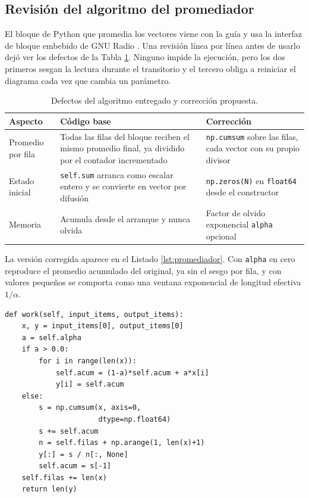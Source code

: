 \documentclass[twocolumn]{IEEEtran}
\begin{document}
\subsection{Revisión del algoritmo del promediador}

El bloque de Python que promedia los vectores viene con la guía y usa la interfaz de bloque embebido de GNU Radio \cite{b2}. Una revisión línea por línea antes de usarlo dejó ver los defectos de la Tabla \ref{tab:correcciones}. Ninguno impide la ejecución, pero los dos primeros sesgan la lectura durante el transitorio y el tercero obliga a reiniciar el diagrama cada vez que cambia un parámetro.

\begin{table}[!ht]
\centering
\caption{Defectos del algoritmo entregado y corrección propuesta.}
\label{tab:correcciones}
\scriptsize
\begin{tabular}{@{}p{1.3cm}p{2.8cm}p{2.8cm}@{}}
\toprule
\textbf{Aspecto} & \textbf{Código base} & \textbf{Corrección} \\
\midrule
Promedio por fila & Todas las filas del bloque reciben el mismo promedio final, ya dividido por el contador incrementado & \texttt{np.cumsum} sobre las filas, cada vector con su propio divisor \\
Estado inicial & \texttt{self.sum} arranca como escalar entero y se convierte en vector por difusión & \texttt{np.zeros(N)} en \texttt{float64} desde el constructor \\
Memoria & Acumula desde el arranque y nunca olvida & Factor de olvido exponencial \texttt{alpha} opcional \\
\bottomrule
\end{tabular}
\end{table}

La versión corregida aparece en el Listado \ref{lst:promediador}. Con \texttt{alpha} en cero reproduce el promedio acumulado del original, ya sin el sesgo por fila, y con valores pequeños se comporta como una ventana exponencial de longitud efectiva $1/\alpha$.

\lstset{language=Python, basicstyle=\scriptsize\ttfamily}
\begin{lstlisting}[caption={Promediador de vectores con corrección por fila y olvido opcional.},label={lst:promediador},numbers=none,xleftmargin=6pt,framexleftmargin=4pt,breaklines=false]
def work(self, input_items, output_items):
    x, y = input_items[0], output_items[0]
    a = self.alpha
    if a > 0.0:
        for i in range(len(x)):
            self.acum = (1-a)*self.acum + a*x[i]
            y[i] = self.acum
    else:
        s = np.cumsum(x, axis=0,
                      dtype=np.float64)
        s += self.acum
        n = self.filas + np.arange(1, len(x)+1)
        y[:] = s / n[:, None]
        self.acum = s[-1]
    self.filas += len(x)
    return len(y)
\end{lstlisting}
\end{document}
